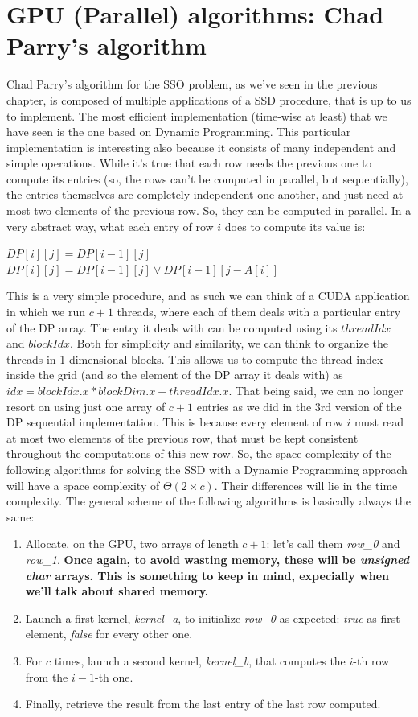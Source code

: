 \documentclass[12pt]{extarticle}
\begin{document}
\section{GPU (Parallel) algorithms: Chad Parry's algorithm}
Chad Parry's algorithm for the SSO problem, as we've seen in the previous chapter, is composed of multiple applications of a SSD procedure, that is up to us to implement. The most efficient implementation (time-wise at least) that we have seen is the one based on Dynamic Programming. This particular implementation is interesting also because it consists of many independent and simple operations. While it's true that each row needs the previous one to compute its entries (so, the rows can't be computed in parallel, but sequentially), the entries themselves are completely independent one another, and just need at most two elements of the previous row. So, they can be computed in parallel.\newline
In a very abstract way, what each entry of row $i$ does to compute its value is:
\begin{algorithmic}
    \State $DP[i][j] = DP[i-1][j]$
\Else
    \State $DP[i][j] = DP[i-1][j] \lor DP[i-1][j-A[i]]$
\EndIf 
\end{algorithmic}
This is a very simple procedure, and as such we can think of a CUDA application in which we run $c+1$ threads, where each of them deals with a particular entry of the DP array. The entry it deals with can be computed using its $threadIdx$ and $blockIdx$. Both for simplicity and similarity, we can think to organize the threads in 1-dimensional blocks. This allows us to compute the thread index inside the grid (and so the element of the DP array it deals with) as $idx = blockIdx.x * blockDim.x + threadIdx.x$. That being said, we can no longer resort on using just one array of $c+1$ entries as we did in the 3rd version of the DP sequential implementation. This is because every element of row $i$ must read at most two elements of the previous row, that must be kept consistent throughout the computations of this new row. So, the space complexity of the following algorithms for solving the SSD with a Dynamic Programming approach will have a space complexity of $\Theta(2 \times c)$. Their differences will lie in the time complexity.\newline
The general scheme of the following algorithms is basically always the same:
\begin{enumerate}
    \item Allocate, on the GPU, two arrays of length $c+1$: let's call them \emph{row\_0} and \emph{row\_1}. \textbf{Once again, to avoid wasting memory, these will be \emph{unsigned char} arrays. This is something to keep in mind, expecially when we'll talk about shared memory.}
    \item Launch a first kernel, \emph{kernel\_a}, to initialize \emph{row\_0} as expected: \emph{true} as first element, \emph{false} for every other one.
    \item For $c$ times, launch a second kernel, \emph{kernel\_b}, that computes the $i$-th row from the $i-1$-th one. 
    \item Finally, retrieve the result from the last entry of the last row computed.
\end{enumerate}
\end{document}

